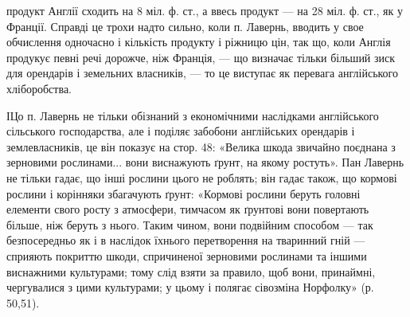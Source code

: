 \parcont{}  %
продукт Англії сходить на 8 міл. ф. ст., а ввесь продукт — на 28 міл. ф. ст.,
як у Франції. Справді це трохи надто сильно, коли п. Лавернь, вводить у свое
обчислення одночасно і кількість продукту і ріжницю цін, так що, коли Англія
продукує певні речі дорожче, ніж Франція, — що визначає тільки більший зиск
для орендарів і земельних власників, — то це виступає як перевага англійського
хліборобства.

ІЦо п. Лавернь не тільки обізнаний з економічними наслідками англійського
сільського господарства, але і поділяє забобони англійських орендарів
і землевласників, це він показує на стор. 48: «Велика шкода звичайно поєднана
з зерновими рослинами... вони виснажують ґрунт, на якому ростуть».
Пан Лавернь не тільки гадає, що інші рослини цього не роблять; він гадає також,
що кормові рослини і корінняки збагачують ґрунт: «Кормові рослини беруть
головні елементи свого росту з атмосфери, тимчасом як ґрунтові вони повертають
більше, ніж беруть з нього. Таким чином, вони подвійним способом — так
безпосередньо як і в наслідок їхнього перетворення на тваринний гній — сприяють
покриттю шкоди, спричиненої зерновими рослинами та іншими виснажними
культурами; тому слід взяти за правило, щоб вони, принаймні, чергувалися з цими
культурами; у цьому і полягає сівозміна Норфолку» (р. 50,51).

